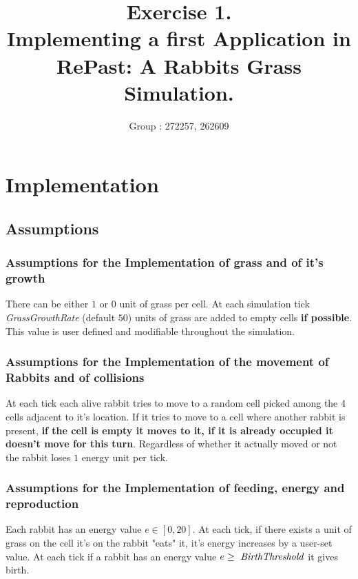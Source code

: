\documentclass[11pt]{article}
\title{\bf Exercise 1.\\ Implementing a first Application in RePast: A Rabbits Grass Simulation.}
\author{Group \textnumero: 272257, 262609}
\begin{document}
\maketitle

\section{Implementation}


\subsection{Assumptions}

\subsubsection{Assumptions for the Implementation of grass and of it's growth}

There can be either $1$ or $0$ unit of grass per cell. At each simulation tick \textit{GrassGrowthRate} (default $50$) units of grass are added to empty cells \textbf{if possible}. This value is user defined and modifiable throughout the simulation.

\subsubsection{Assumptions for the Implementation of the movement of Rabbits and of collisions}

At each tick each alive rabbit tries to move to a random cell picked among the 4 cells adjacent to it's location. If it tries to move to a cell where another rabbit is present, \textbf{if the cell is empty it moves to it, if it is already occupied it doesn't move for this turn}. Regardless of whether it actually moved or not the rabbit loses $1$ energy unit per tick.

\subsubsection{Assumptions for the Implementation of feeding, energy and reproduction}

Each rabbit has an energy value $e \in [0,20]$. At each tick, if there exists a unit of grass on the cell it's on the rabbit "eats" it, it's energy increases by a user-set value. At each tick if a rabbit has an energy value $e \geq \text{ \textit{BirthThreshold}}$ it gives birth.
\end{document}
